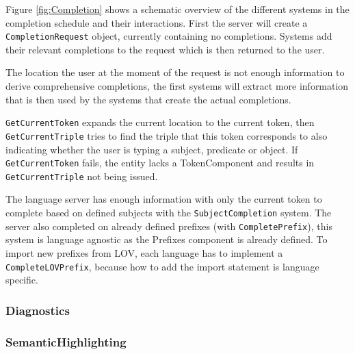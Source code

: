 Figure \ref{fig:Completion} shows a schematic overview of the different systems in the completion schedule and their interactions.
First the server will create a \texttt{CompletionRequest} object, currently containing no completions.
Systems add their relevant completions to the request which is then returned to the user.

The location the user at the moment of the request is not enough information to derive comprehensive completions, 
the first systems will extract more information that is then used by the systems that create the actual completions.

\texttt{GetCurrentToken} expands the current location to the current token, then \texttt{GetCurrentTriple} tries to find the triple that this token corresponds to also indicating whether the user is typing a subject, predicate or object.
If \texttt{GetCurrentToken} fails, the entity lacks a TokenComponent and results in \texttt{GetCurrentTriple} not being issued.

The language server has enough information with only the current token to complete based on defined subjects with the \texttt{SubjectCompletion} system.
The server also completed on already defined prefixes (with \texttt{CompletePrefix}), this system is language agnostic as the Prefixes component is already defined.
To import new prefixes from LOV, each language has to implement a \texttt{CompleteLOVPrefix}, because how to add the import statement is language specific.


\subsubsection*{Diagnostics}




\subsubsection*{SemanticHighlighting}

